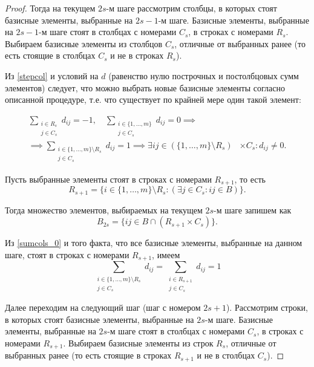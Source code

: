 \documentclass[12pt]{article}
\theoremstyle{definition}
\theoremstyle{plain}
\theoremstyle{definition}
\begin{document}
\begin{proof}
Тогда на текущем $2s$-м шаге рассмотрим столбцы, в которых стоят базисные
элементы, выбранные на $2s-1$-м шаге. Базисные элементы,
выбранные на $2s-1$-м шаге стоят в столбцах
с номерами $C_s$, в строках с номерами $R_s$.
Выбираем базисные элементы из
столбцов $C_s$, отличные от
выбранных ранее (то есть стоящие в столбцах $C_s$ и не в строках $R_s$).

Из \eqref{stepcol} и условий на $d$ (равенство нулю построчных и постолбцовых
сумм элементов) следует, что можно выбрать новые базисные элементы согласно
описанной процедуре, т.е. что существует по крайней мере один такой элемент:

\begin{equation}\label{sumcols_0}
\begin{aligned}
\sum_{\substack{i \in R_s \\ j \in C_s}} d_{ij} = -1, \quad
\sum_{\substack{i \in \{1,\dots,m\} \\ j \in C_s}} d_{ij} = 0 \implies &\\
\implies
\sum_{\substack{i \in \{1,\dots,m\} \setminus R_s \\ j \in C_s}} d_{ij} = 1
\implies \exists ij \in (\{1,\dots,m\} \setminus R_s) & \times C_s: d_{ij} \neq 0.
\end{aligned}
\end{equation}

Пусть выбранные элементы стоят в строках с номерами $R_{s+1}$, то есть
\[
R_{s+1} = \{i \in \{1,\dots,m\} \setminus R_s: (\exists j \in C_s: ij \in B)\}.
\]

Тогда множество элементов, выбираемых на текущем $2s$-м шаге запишем как
\[
B_{2s} = \{ij \in B \cap (R_{s+1} \times C_s)\}.
\]

Из \eqref{sumcols_0} и того факта, что все базисные элементы, выбранные
на данном шаге, стоят в строках с номерами $R_{s+1}$, имеем
\begin{equation}\label{steprow}
\sum_{\substack{i \in \{1,\dots,m\} \setminus R_s \\ j \in C_s}} d_{ij}
= \sum_{\substack{i \in R_{s+1} \\ j \in C_s}} d_{ij}
= 1
\end{equation}

Далее переходим на следующий шаг (шаг с номером $2s + 1$).
Рассмотрим строки, в которых стоят базисные
элементы, выбранные на $2s$-м шаге. Базисные элементы,
выбранные на $2s$-м шаге стоят в столбцах
с номерами $C_s$, в строках с номерами $R_{s+1}$.
Выбираем базисные элементы из
строк $R_s$, отличные от
выбранных ранее (то есть стоящие в строках $R_{s+1}$ и не в столбцах $C_s$).


\end{proof}
\end{document}
